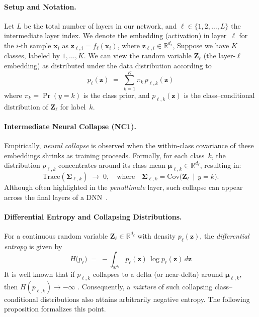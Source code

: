 \paragraph{Setup and Notation.}
Let $L$ be the total number of layers in our network, and $\ell \in \{1,2,\ldots,L\}$ the intermediate layer index. 
We denote the embedding (activation) in layer~$\ell$ for the $i$-th sample $\mathbf{x}_i$ as $ \mathbf{z}_{\ell,i} = f_\ell(\mathbf{x}_i)$, where $\mathbf{z}_{\ell,i} \in \mathbb{R}^{d_\ell}$,
Suppose we have $K$ classes, labeled by $1,\dots,K$.  We can view the random variable $\mathbf{Z}_\ell$ (the layer-$\ell$ embedding) as distributed under the data distribution according to
\begin{equation*}
  p_\ell(\mathbf{z}) 
  \;=\; 
  \sum_{k=1}^K \pi_k \, p_{\ell,k}(\mathbf{z})
\end{equation*}
where $\pi_k = \Pr(y = k)$ is the class prior, and $p_{\ell,k}(\mathbf{z})$ is the class--conditional distribution of $\mathbf{Z}_\ell$ for label~$k$. 

\paragraph{Intermediate Neural Collapse (NC1).}
Empirically, \emph{neural collapse} is observed when the within-class covariance of these embeddings shrinks as training proceeds. Formally, for each class~$k$, the distribution $p_{\ell,k}$ concentrates around its class mean $\boldsymbol{\mu}_{\ell,k} \in \mathbb{R}^{d_\ell}$, resulting in:
\[
  \mathrm{Trace}(\boldsymbol{\Sigma}_{\ell,k}) 
  \;\to\; 0,
  \quad\text{where}\quad
  \boldsymbol{\Sigma}_{\ell,k} 
  = 
  \mathrm{Cov}\bigl(\mathbf{Z}_\ell \,\mid\, y=k\bigr).
\]
Although often highlighted in the \emph{penultimate} layer, such collapse can appear across the final layers of a DNN~\cite{rangamani2023feature,harun2024what}.

\paragraph{Differential Entropy and Collapsing Distributions.}
For a continuous random variable $\mathbf{Z}_\ell \in \mathbb{R}^{d_\ell}$ with density $p_\ell(\mathbf{z})$, the \emph{differential entropy} is given by
\begin{equation*}
   H\bigl(p_\ell\bigr) 
   \;=\; 
   - \int_{\mathbb{R}^{d_\ell}}
     p_\ell(\mathbf{z}) \,\log p_\ell(\mathbf{z})\, d\mathbf{z}
\end{equation*}
It is well known that if $p_{\ell,k}$ collapses to a delta (or near-delta) around $\boldsymbol{\mu}_{\ell,k}$, then $H(p_{\ell,k}) \to -\infty$ \cite{cover1999elements}.  Consequently, a \emph{mixture} of such collapsing class--conditional distributions also attains arbitrarily negative entropy.  The following proposition formalizes this point. %

